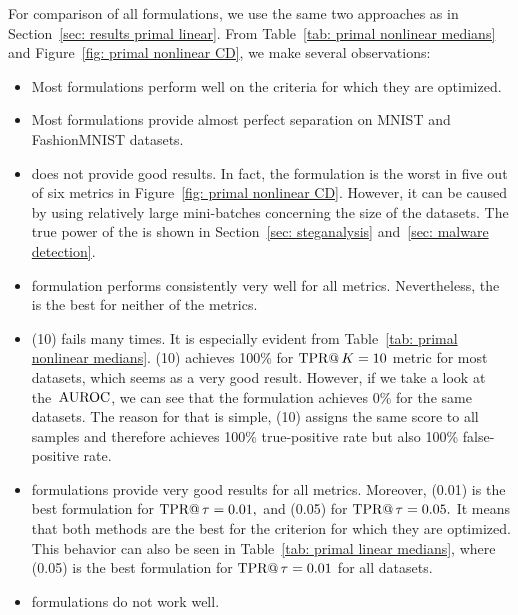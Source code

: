 For comparison of all formulations, we use the same two approaches as in Section~\ref{sec: results primal linear}. From Table~\ref{tab: primal nonlinear medians} and Figure~\ref{fig: primal nonlinear  CD}, we make several observations:
\begin{itemize}
  \item Most formulations perform well on the criteria for which they are optimized.
  \item Most formulations provide almost perfect separation on MNIST and FashionMNIST datasets.
  \item \DeepTopPush does not provide good results. In fact, the formulation is the worst in five out of six metrics in Figure~\ref{fig: primal nonlinear  CD}. However, it can be caused by using relatively large mini-batches concerning the size of the datasets. The true power of the \DeepTopPush is shown in Section~\ref{sec: steganalysis} and~\ref{sec: malware detection}.
  \item \BaseLine formulation performs consistently very well for all metrics. Nevertheless, the \BaseLine is the best for neither of the metrics.
  \item \TopPushK(10) fails many times. It is especially evident from Table~\ref{tab: primal nonlinear medians}. \TopPushK(10) achieves 100\% for $\operatorname{TPR@}K = 10$ metric for most datasets, which seems as a very good result. However, if we take a look at the~$\operatorname{AUROC}$, we can see that the formulation achieves 0\% for the same datasets. The reason for that is simple, \TopPushK(10) assigns the same score to all samples and therefore achieves 100\% true-positive rate but also 100\% false-positive rate.
  \item \PatMatNP formulations provide very good results for all metrics. Moreover, \PatMatNP(0.01) is the best formulation for $\operatorname{TPR@}\tau = 0.01,$ and \PatMatNP(0.05) for $\operatorname{TPR@}\tau = 0.05.$ It means that both methods are the best for the criterion for which they are optimized. This behavior can also be seen in Table~\ref{tab: primal linear medians}, where \PatMatNP(0.05) is the best formulation for $\operatorname{TPR@}\tau = 0.01$ for all datasets.
  \item \tauFPL formulations do not work well.
\end{itemize}


